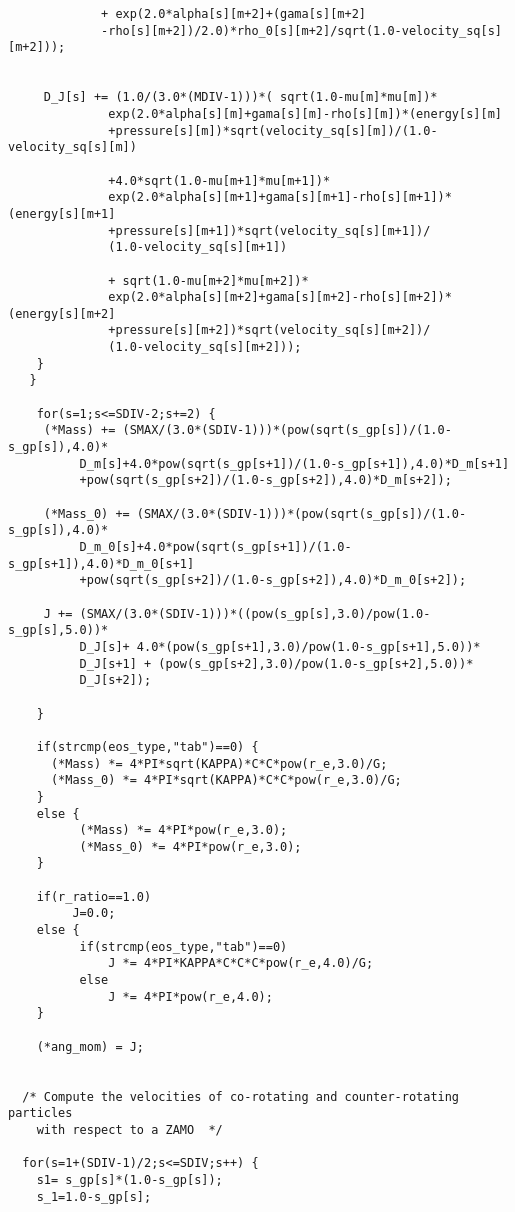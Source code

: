 \begin{verbatim}
             + exp(2.0*alpha[s][m+2]+(gama[s][m+2]
             -rho[s][m+2])/2.0)*rho_0[s][m+2]/sqrt(1.0-velocity_sq[s][m+2]));
  

     D_J[s] += (1.0/(3.0*(MDIV-1)))*( sqrt(1.0-mu[m]*mu[m])*
              exp(2.0*alpha[s][m]+gama[s][m]-rho[s][m])*(energy[s][m]
              +pressure[s][m])*sqrt(velocity_sq[s][m])/(1.0-velocity_sq[s][m])
  
              +4.0*sqrt(1.0-mu[m+1]*mu[m+1])*
              exp(2.0*alpha[s][m+1]+gama[s][m+1]-rho[s][m+1])*(energy[s][m+1]
              +pressure[s][m+1])*sqrt(velocity_sq[s][m+1])/
              (1.0-velocity_sq[s][m+1])

              + sqrt(1.0-mu[m+2]*mu[m+2])*
              exp(2.0*alpha[s][m+2]+gama[s][m+2]-rho[s][m+2])*(energy[s][m+2]
              +pressure[s][m+2])*sqrt(velocity_sq[s][m+2])/
              (1.0-velocity_sq[s][m+2]));
    }
   }

    for(s=1;s<=SDIV-2;s+=2) { 
     (*Mass) += (SMAX/(3.0*(SDIV-1)))*(pow(sqrt(s_gp[s])/(1.0-s_gp[s]),4.0)*
          D_m[s]+4.0*pow(sqrt(s_gp[s+1])/(1.0-s_gp[s+1]),4.0)*D_m[s+1]
          +pow(sqrt(s_gp[s+2])/(1.0-s_gp[s+2]),4.0)*D_m[s+2]);

     (*Mass_0) += (SMAX/(3.0*(SDIV-1)))*(pow(sqrt(s_gp[s])/(1.0-s_gp[s]),4.0)*
          D_m_0[s]+4.0*pow(sqrt(s_gp[s+1])/(1.0-s_gp[s+1]),4.0)*D_m_0[s+1]
          +pow(sqrt(s_gp[s+2])/(1.0-s_gp[s+2]),4.0)*D_m_0[s+2]);
 
     J += (SMAX/(3.0*(SDIV-1)))*((pow(s_gp[s],3.0)/pow(1.0-s_gp[s],5.0))*
          D_J[s]+ 4.0*(pow(s_gp[s+1],3.0)/pow(1.0-s_gp[s+1],5.0))*
          D_J[s+1] + (pow(s_gp[s+2],3.0)/pow(1.0-s_gp[s+2],5.0))*
          D_J[s+2]);

    }
   
    if(strcmp(eos_type,"tab")==0) {
      (*Mass) *= 4*PI*sqrt(KAPPA)*C*C*pow(r_e,3.0)/G;
      (*Mass_0) *= 4*PI*sqrt(KAPPA)*C*C*pow(r_e,3.0)/G;
    }
    else {
          (*Mass) *= 4*PI*pow(r_e,3.0);
          (*Mass_0) *= 4*PI*pow(r_e,3.0);
    }
 
    if(r_ratio==1.0) 
         J=0.0; 
    else {    
          if(strcmp(eos_type,"tab")==0) 
              J *= 4*PI*KAPPA*C*C*C*pow(r_e,4.0)/G;
          else 
              J *= 4*PI*pow(r_e,4.0);
    }

    (*ang_mom) = J;


  /* Compute the velocities of co-rotating and counter-rotating particles
	with respect to a ZAMO 	*/

  for(s=1+(SDIV-1)/2;s<=SDIV;s++) {
    s1= s_gp[s]*(1.0-s_gp[s]);
    s_1=1.0-s_gp[s];
        

\end{verbatim}

